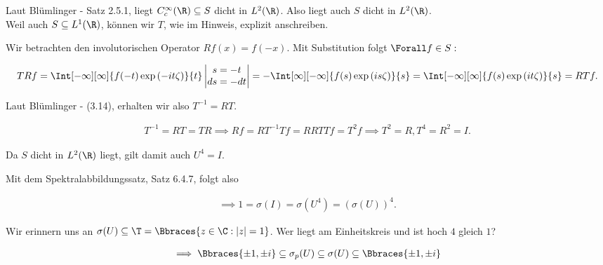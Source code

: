 \begin{solution}

Laut Blümlinger - Satz 2.5.1, liegt $C_c^\infty(\R) \subseteq S$ dicht in $L^2(\R)$.
Also liegt auch $S$ dicht in $L^2(\R)$. \\

Weil auch $S \subseteq L^1(\R)$, können wir $T$, wie im Hinweis, explizit anschreiben. \\


Wir betrachten den involutorischen Operator $R f(x) = f(-x)$.
Mit Substitution folgt $\Forall f \in S:$

\begin{align*}
  T R f
  =
  \Int[-\infty][\infty]
  {f(-t) \exp{(-i t \zeta)}}{t}
  \begin{vmatrix}
    s = -t \\
    ds = -dt
  \end{vmatrix}
  =
  -\Int[\infty][-\infty]{f(s) \exp{(i s \zeta)}}{s}
  =
  \Int[-\infty][\infty]{f(s) \exp{(i t \zeta)}}{s}
  =
  R T f.
\end{align*}

Laut Blümlinger - (3.14), erhalten wir also $T^{-1} = R T$.

\begin{align*}
  T^{-1} = R T = T R
  \implies
  R f = R T^{-1} T f = R R T T f = T^2 f
  \implies
  T^2 = R, T^4 = R^2 = I.
\end{align*}

Da $S$ dicht in $L^2(\R)$ liegt, gilt damit auch $U^4 = I$.


Mit dem Spektralabbildungssatz, Satz 6.4.7, folgt also

\begin{align*}
  \implies
  1 = \sigma(I) = \sigma(U^4) = (\sigma(U))^4.
\end{align*}

Wir erinnern uns an $\sigma(U) \subseteq \T = \Bbraces{z \in \C: |z| = 1}$.
Wer liegt am Einheitskreis und ist hoch $4$ gleich $1$?

\begin{align*}
  \implies
  \Bbraces{\pm 1, \pm i}
  \subseteq
  \sigma_p(U)
  \subseteq
  \sigma(U)
  \subseteq
  \Bbraces{\pm 1, \pm i}
\end{align*}

\end{solution}
